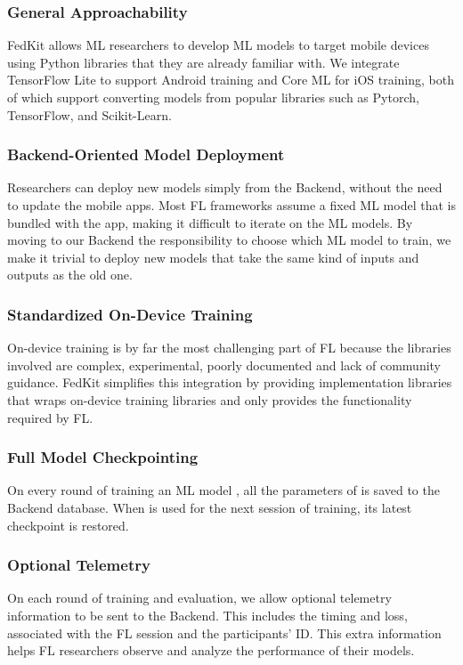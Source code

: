 \documentclass[letterpaper]{article} %
\begin{document}
\subsubsection{General Approachability}
FedKit allows ML researchers to develop ML models to target mobile devices
using Python libraries that they are already familiar with.
We integrate TensorFlow Lite to support Android training and Core ML for iOS
training,
both of which support converting models from popular libraries such as Pytorch,
TensorFlow, and Scikit-Learn.

\subsubsection{Backend-Oriented Model Deployment}
Researchers can deploy new models simply from the Backend,
without the need to update the mobile apps.
Most FL frameworks assume a fixed ML model that is bundled with the app,
making it difficult to iterate on the ML models.
By moving to our Backend the responsibility to choose which ML model to train,
we make it trivial to deploy new models that take the same kind of inputs and
outputs as the old one.

\subsubsection{Standardized On-Device Training}
On-device training is by far the most challenging part of FL because
the libraries involved are complex, experimental, poorly documented
and lack of community guidance.
FedKit simplifies this integration by providing implementation libraries
that wraps on-device training libraries and
only provides the functionality required by FL.

\subsubsection{Full Model Checkpointing}
On every round of training an ML model \model,
all the parameters of \model{} is saved to the Backend database.
When \model{} is used for the next session of training,
its latest checkpoint is restored.

\subsubsection{Optional Telemetry}
On each round of training and evaluation,
we allow optional telemetry information to be sent to the Backend.
This includes the timing and loss,
associated with the FL session and the participants' ID.
This extra information helps FL researchers observe and analyze
the performance of their models.
\end{document}
